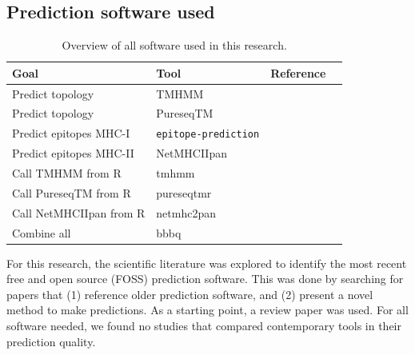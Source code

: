 \subsection{Prediction software used}
\label{subsec:prediction_software_used}

\begin{table}[]
  \begin{tabular}{llll}
    Goal & Tool & Reference \\ 
    \hline
    Predict topology                  & TMHMM                     & \cite{krogh2001predicting} \\
    Predict topology                  & PureseqTM                 & \cite{wang2019efficient} \\
    Predict epitopes MHC-I            & \verb;epitope-prediction; & \cite{bianchi2017} \\
    Predict epitopes MHC-II           & NetMHCIIpan               & \cite{nielsen2008quantitative,karosiene2013netmhciipan} \\
    Call TMHMM from R                 & tmhmm                     & \cite{tmhmm} \\
    Call PureseqTM from R             & pureseqtmr                & \cite{pureseqtmr} \\
    Call NetMHCIIpan from R           & netmhc2pan                & \cite{netmhc2pan} \\
    Combine all                       & bbbq                      & \cite{bbbq}
  \end{tabular}
  \caption{
    Overview of all software used in this research.
  }
  \label{table:software_used}
\end{table}

For this research, the scientific literature was explored 
to identify the most recent free and open source (FOSS) prediction software.
This was done by searching for papers that (1) reference older
prediction software, and (2) present a novel method to make predictions.
As a starting point, a review paper was used.
For all software needed, we found no studies that compared contemporary tools 
in their prediction quality.



